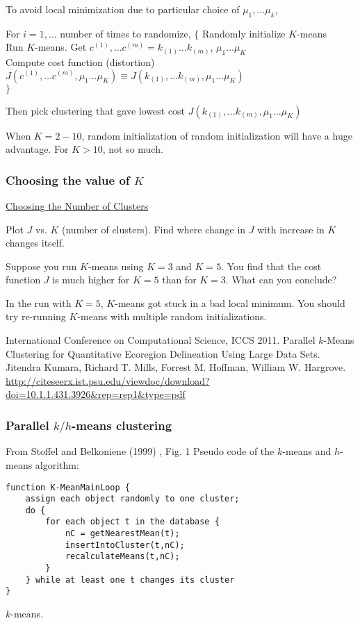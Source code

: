 \documentclass[10pt]{amsart}
\begin{document}
\begin{multicols*}{2}
To avoid local minimization due to particular choice of $\mu_1, \dots \mu_k$, 

For $i=1, \dots $ number of times to randomize, $\lbrace$ 
Randomly initialize $K$-means \\
Run $K$-means.  Get $c^{(1)}, \dots c^{(m)} = k_{(1)} \dots k_{(m)}$, $\mu_1\dots \mu_K$  \\
Compute cost function (distortion) $J(c^{(1)}, \dots c^{(m)}, \mu_1 \dots \mu_K)\equiv J(k_{(1)}, \dots k_{(m)}, \mu_1 \dots \mu_K)$ \\
$\rbrace$

Then pick clustering that gave lowest cost $J(k_{(1)}, \dots k_{(m)}, \mu_1 \dots \mu_K)$

When $K=2-10$, random initialization of random initialization will have a huge advantage.  For $K>10$, not so much.  

\subsubsection{Choosing the value of $K$}
\href{https://www.coursera.org/learn/machine-learning/lecture/Ks0E9/choosing-the-number-of-clusters}{Choosing the Number of Clusters}

Plot $J$ vs. $K$ (number of clusters).  Find where change in $J$ with increase in $K$ changes itself.  

Suppose you run $K$-means using $K=3$ and $K=5$.  You find that the cost function $J$ is much higher for $K=5$ than for $K=3$.  What can you conclude? 

In the run with $K=5$, $K$-means got stuck in a bad local minimum.  You should try re-running $K$-means with multiple random initializations.  

International Conference on Computational Science, ICCS 2011.  Parallel $k$-Means Clustering for Quantitative Ecoregion Delineation Using Large Data Sets.  Jitendra Kumara, Richard T. Mills, Forrest M. Hoffman, William W. Hargrove.  
\url{http://citeseerx.ist.psu.edu/viewdoc/download?doi=10.1.1.431.3926&rep=rep1&type=pdf}

\subsubsection{Parallel $k/h$-means clustering}
From Stoffel and Belkoniene (1999) \cite{StBe1999}, 
Fig. 1 Pseudo code of the $k$-means and $h$-means algorithm:
\begin{lstlisting}
function K-MeanMainLoop {
	assign each object randomly to one cluster;
	do {
		for each object t in the database {
			nC = getNearestMean(t);
			insertIntoCluster(t,nC);
			recalculateMeans(t,nC);
		}
	} while at least one t changes its cluster
}
\end{lstlisting}
$k$-means.  


\end{multicols*}
\end{document}
